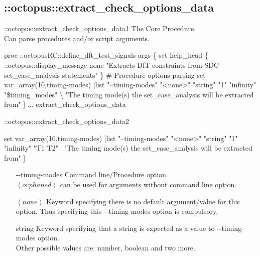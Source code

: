 \documentclass[handout]{beamer}
\begin{document}
\subsection{::octopus::extract\_check\_options\_data}
\begin{frame}[fragile]{::octopus::extract\_check\_options\_data}{1}
	\alert{The Core Procedure}. \\Can parse procedures and/or script arguments.

	{\tiny
	\begin{semiverbatim}
proc ::octopusRC::define_dft_test_signals \alert{args} \{
    set help_head \{
        ::octopus::display_message none "Extracts DfT constraints from SDC set_case_analysis statements"
    \}
    # Procedure options parsing
    set \alert{var_array}(10,timing-modes)	[list "--timing-modes" "{<none>}" "string" "1" "infinity" "\$timing_modes" \textbackslash
        "The timing mode(s) the set_case_analysis will be extracted from" ]
      ...
    \alert{extract_check_options_data}
	\end{semiverbatim}
	}
\end{frame}

\begin{frame}[fragile]{::octopus::extract\_check\_options\_data}{2}
	{\tiny
	\begin{semiverbatim}
	set var_array(10,timing-modes)	[list "\alert<1>{--timing-modes}" "\alert<2>{<none>}" "\alert<3>{string}" "1" "infinity" "T1 T2" \
		"The timing mode(s) the set_case_analysis will be extracted from" ]
	\end{semiverbatim}
	}
	\begin{itemize}[<+->]
	\item [{\tiny -{}-timing-modes}] Command line/Procedure \alert{option}. \\
	$\left\langle orphaned \right\rangle$ can be used for arguments without command line option.
	\item [$\left\langle none \right\rangle$] Keyword specifying there is no
	default \alert{argument/value} for this option. Thus specifying this
	-{}-timing-modes option is compulsory.
	\item [string] Keyword specifying that a string is expected as a value
	to -{}-timing-modes option.\\
	{\small Other possible values are: \alert{number}, \alert{boolean} and two more.}
	\end{itemize}
\end{frame}
\end{document}
